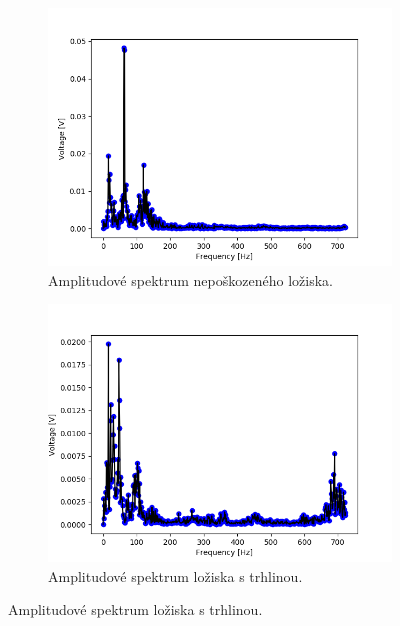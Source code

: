         \begin{figure} [!hbp]
            \centering
            \caption{Druhý experiment – amplitudová spektra.}
            \begin{subfigure}[b]{0.48\textwidth}
                 \centering
                 \includegraphics[width=\textwidth]{Experiment/Figs/3000_rpm_1khz_ok.png}
                 \caption {Amplitudové spektrum nepoškozeného ložiska.}
             \end{subfigure}
             \hfill
            \begin{subfigure}[b]{0.48\textwidth}
                \includegraphics[width=\textwidth]{Experiment/Figs/3000_rpm_1khz_sterbina.png}
                \caption {Amplitudové spektrum ložiska s trhlinou.}
            \end{subfigure}
        \end{figure} 
